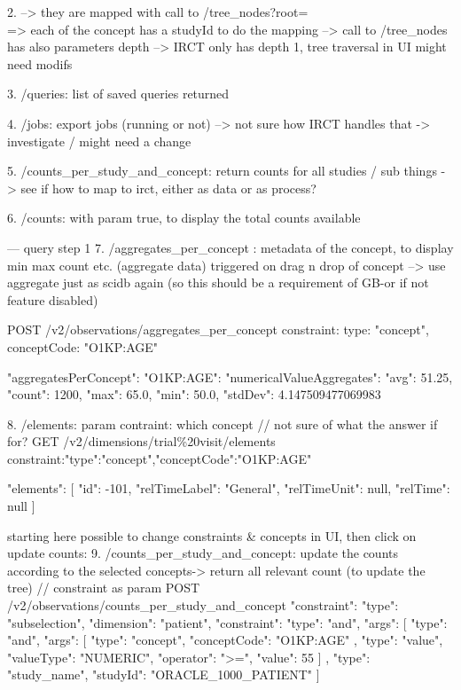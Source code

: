 2. --> they are mapped with call to /tree\_nodes?root=\\ => each of the concept has a studyId to do the mapping
--> call to /tree\_nodes has also parameters depth --> IRCT only has depth 1, tree traversal in UI might need modifs

3. /queries: list of saved queries returned

4. /jobs: export jobs (running or not) --> not sure how IRCT handles that -> investigate / might need a change

5. /counts\_per\_study\_and\_concept: return counts for all studies / sub things -> see if how to map to irct, either as data or as process?

6. /counts: with param true, to display the total counts available

--- query step 1
7. /aggregates\_per\_concept : metadata of the concept, to display min max count etc. (aggregate data)
triggered on drag n drop of concept
--> use aggregate just as scidb again (so this should be a requirement of GB-or if not feature disabled)

POST /v2/observations/aggregates\_per\_concept
{constraint: {type: "concept", conceptCode: "O1KP:AGE"}}

{
  "aggregatesPerConcept": {
    "O1KP:AGE": {
      "numericalValueAggregates": {
        "avg": 51.25,
        "count": 1200,
        "max": 65.0,
        "min": 50.0,
        "stdDev": 4.147509477069983
      }
    }
  }
}


8. /elements: param contraint: which concept // not sure of what the answer if for?
GET /v2/dimensions/trial\%20visit/elements
constraint:{"type":"concept","conceptCode":"O1KP:AGE"}

{
  "elements": 
  [
    {
      "id": -101,
      "relTimeLabel": "General",
      "relTimeUnit": null,
      "relTime": null
    }
  ]
}


starting here possible to change constraints \& concepts in UI, then click on update counts:
9. /counts\_per\_study\_and\_concept: update the counts according to the selected concepts-> return all relevant count (to update the tree) // constraint as param
POST /v2/observations/counts\_per\_study\_and\_concept
{
  "constraint": {
    "type": "subselection",
    "dimension": "patient",
    "constraint": {
      "type": "and",
      "args": [
        {
          "type": "and",
          "args": [
            {
              "type": "concept",
              "conceptCode": "O1KP:AGE"
            },
            {
              "type": "value",
              "valueType": "NUMERIC",
              "operator": ">=",
              "value": 55
            }
          ]
        },
        {
          "type": "study_name",
          "studyId": "ORACLE_1000_PATIENT"
        }
      ]
    }
  }
}

